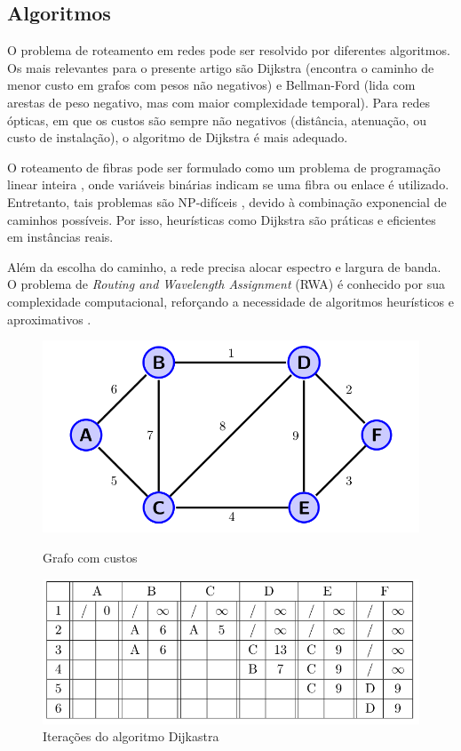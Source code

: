 \subsection{Algoritmos}
O problema de roteamento em redes pode ser resolvido por diferentes algoritmos.
Os mais relevantes para o presente artigo são Dijkstra (encontra o caminho de
menor custo em grafos com pesos não negativos) \cite{dijkstra2022note} e
Bellman-Ford (lida com arestas de peso negativo, mas com maior complexidade
temporal). Para redes ópticas, em que os custos são sempre não negativos
(distância, atenuação, ou custo de instalação), o algoritmo de Dijkstra é mais
adequado.

O roteamento de fibras pode ser formulado como um problema de programação
linear inteira \cite{griva2008linear}, onde variáveis binárias indicam se uma
fibra ou enlace é utilizado. Entretanto, tais problemas são NP-difíceis
\cite{artigorwa}, devido à combinação exponencial de caminhos possíveis. Por
isso, heurísticas como Dijkstra são práticas e eficientes em instâncias reais.

Além da escolha do caminho, a rede precisa alocar espectro e largura de banda.
O problema de \textit{Routing and Wavelength Assignment} (RWA) é conhecido por
sua complexidade computacional, reforçando a necessidade de algoritmos
heurísticos e aproximativos \cite{artigorwa}.

\begin{figure}
  \begin{minipage}[c]{0.45\linewidth}
	\includegraphics[width=\linewidth]{./images/dijkastra_01.png}
	\caption{Grafo com custos}
	\label{fig:dijkastra_graph}
  \end{minipage}
  \hfill
  \begin{minipage}[c]{0.58\linewidth}
	\includegraphics[width=\linewidth]{./images/dijkastra_02.png}
	\caption{Iterações do algoritmo Dijkastra}
	\label{fig:dijkastra_table}
  \end{minipage}
\end{figure}

